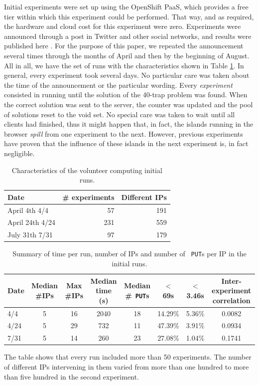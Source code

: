 \documentclass[journal,onecolumn]{IEEEtran}
\begin{document}
Initial experiments were set up using the OpenShift
PaaS, which provides a free tier within which this 
experiment could be performed. That way, and as required, the hardware
and cloud cost for this experiment were zero. Experiments were
announced through a post in Twitter and other social networks, and
results were published here \cite{DBLP:conf/gecco/GuervosG15}. For the
purpose of this paper, we repeated the announcement several times
through the months of April and then by the beginning of August. All
in all, we have the set of runs with the characteristics shown in
Table \ref{tab:runs}. In general, every experiment took several
days. No particular care was taken about the time of the announcement
or the particular wording. Every {\em experiment} consisted in running
until the solution of the 40-trap problem was found. When the correct
solution was sent to the server, the counter was updated and the pool
of solutions reset to the void set. No special care was taken to wait
until all clients had finished, thus it might happen that, in fact,
the islands running in the browser {\em spill} from one experiment to
the next. However, previous experiments have proven that the influence
of these islands in the next experiment is, in fact negligible.
%
\begin{table}
\caption{Characteristics of the volunteer computing initial runs. \label{tab:runs}}
\begin{center}
\begin{tabular}{l|rr}
\hline
Date & \# experiments & Different IPs \\
\hline
April 4th 4/4 & 57 & 191 \\
April 24th 4/24 &  231 & 559 \\
July 31th 7/31 & 97 & 179 \\
\hline
\end{tabular}
\end{center}
\end{table}
%
\begin{table}
\caption{Summary of time per run, number of IPs and number of {\tt
    PUT}s per IP in the initial runs. \label{tab:summary:os}}
\begin{center}
\begin{tabular}{l|ccccccc}
\hline
Date & Median \#IPs & Max \#IPs & Median time (s) & Median \#{\tt
  PUT}s & $<$ 69s & $<$ 3.46s & Inter-experiment correlation\\
\hline
4/4 & 5 & 16 & 2040 & 18 & 14.29\% & 5.36\% & 0.0082 \\
4/24 &  5 & 29 & 732 & 11 & 47.39\% & 3.91\% & 0.0934\\
7/31 & 5 & 14 & 260 & 23 & 27.08\% & 1.04\%  & 0.1741\\
\hline
\end{tabular}
\end{center}
\end{table}
%
The table shows that every run included more than 50 experiments. The
number of different IPs intervening in them varied from more than one
hundred to more than five hundred in the second experiment.
\end{document}

